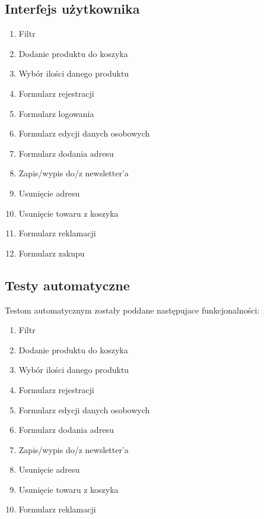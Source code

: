 \documentclass[10pt]{report}
\begin{document}
\subsection{Interfejs użytkownika}

\begin{enumerate}
	\item Filtr
	\item Dodanie produktu do koszyka
	\item Wybór ilości danego produktu
	\item Formularz rejestracji
	\item Formularz logowania
	\item Formularz edycji danych osobowych
	\item Formularz dodania adresu
	\item Zapis/wypis do/z newsletter'a
	\item Usunięcie adresu
	\item Usunięcie towaru z koszyka
	\item Formularz reklamacji
	\item Formularz zakupu
	
\end{enumerate} 

\subsection{Testy automatyczne}
Testom automatycznym zostały poddane następujace funkcjonalności:
\begin{enumerate}
	\item Filtr
	\item Dodanie produktu do koszyka
	\item Wybór ilości danego produktu
	\item Formularz rejestracji
	\item Formularz edycji danych osobowych
	\item Formularz dodania adresu
	\item Zapis/wypis do/z newsletter'a
	\item Usunięcie adresu
	\item Usunięcie towaru z koszyka
	\item Formularz reklamacji
	
\end{enumerate} 

	
\end{document}
